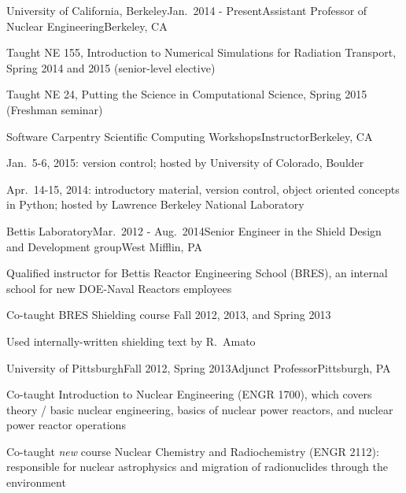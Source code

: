 \begin{rSubsection}{University of California, Berkeley}{Jan.\ 2014 - Present}{Assistant Professor of Nuclear Engineering}{Berkeley, CA}
\item Taught NE 155, Introduction to Numerical Simulations for Radiation Transport, Spring 2014 and 2015 (senior-level elective)
\item Taught NE 24, Putting the Science in Computational Science, Spring 2015 (Freshman seminar)
\end{rSubsection}


\begin{rSubsection}{Software Carpentry Scientific Computing Workshops}{}{Instructor}{Berkeley, CA}
\item Jan.\ 5-6, 2015: version control; hosted by University of Colorado, Boulder
\item Apr.\ 14-15, 2014: introductory material, version control, object oriented concepts in Python; hosted by Lawrence Berkeley National Laboratory
\end{rSubsection}



\begin{rSubsection}{Bettis Laboratory}{Mar.\ 2012 - Aug.\ 2014}{Senior Engineer in the Shield Design and Development group}{West Mifflin, PA}
\item Qualified instructor for Bettis Reactor Engineering School (BRES), an internal school for new DOE-Naval Reactors employees
\item Co-taught BRES Shielding course Fall 2012, 2013, and Spring 2013
\item Used internally-written shielding text by R.\ Amato
\end{rSubsection}


\begin{rSubsection}{University of Pittsburgh}{Fall 2012, Spring 2013}{Adjunct Professor}{Pittsburgh, PA}
\item Co-taught Introduction to Nuclear Engineering (ENGR 1700), which covers theory / basic nuclear engineering, basics of nuclear power reactors, and nuclear power reactor operations
\item Co-taught \textit{new} course Nuclear Chemistry and Radiochemistry (ENGR 2112): responsible for nuclear astrophysics and migration of radionuclides through the environment
\end{rSubsection}

